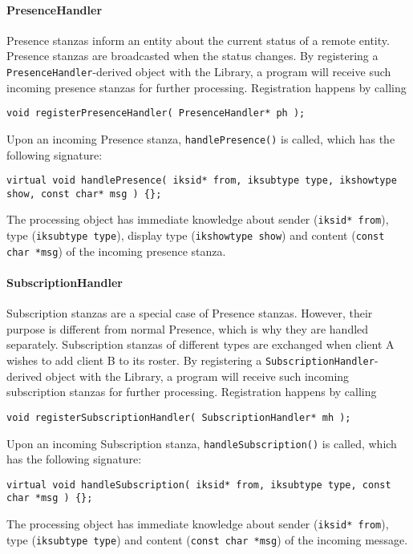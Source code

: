 \paragraph{PresenceHandler}
Presence stanzas inform an entity about the current status of a remote entity. Presence stanzas are broadcasted when the status changes. By registering a \texttt{PresenceHandler}-derived object with the Library, a program will receive such incoming presence stanzas for further processing. Registration happens by calling
\begin{flushleft}
\texttt{void registerPresenceHandler( PresenceHandler* ph );}
\end{flushleft}
Upon an incoming Presence stanza, \texttt{handlePresence()} is called, which has the following signature:
\begin{flushleft}
\texttt{virtual void handlePresence( iksid* from, iksubtype type, ikshowtype show, const char* msg ) \{\};}
\end{flushleft}
The processing object has immediate knowledge about sender (\texttt{iksid* from}), type (\texttt{iksubtype type}), display type (\texttt{ikshowtype show}) and content (\texttt{const char *msg}) of the incoming presence stanza.

\paragraph{SubscriptionHandler}
Subscription stanzas are a special case of Presence stanzas. However, their purpose is different from normal Presence, which is why they are handled separately. Subscription stanzas of different types are exchanged when client A wishes to add client B to its roster. By registering a \texttt{SubscriptionHandler}-derived object with the Library, a program will receive such incoming subscription stanzas for further processing. Registration happens by calling
\begin{flushleft}
\texttt{void registerSubscriptionHandler( SubscriptionHandler* mh );}
\end{flushleft}
Upon an incoming Subscription stanza, \texttt{handleSubscription()} is called, which has the following signature:
\begin{flushleft}
\texttt{virtual void handleSubscription( iksid* from, iksubtype type, const char *msg ) \{\};}
\end{flushleft}
The processing object has immediate knowledge about sender (\texttt{iksid* from}), type (\texttt{iksubtype type}) and content (\texttt{const char *msg}) of the incoming message.

